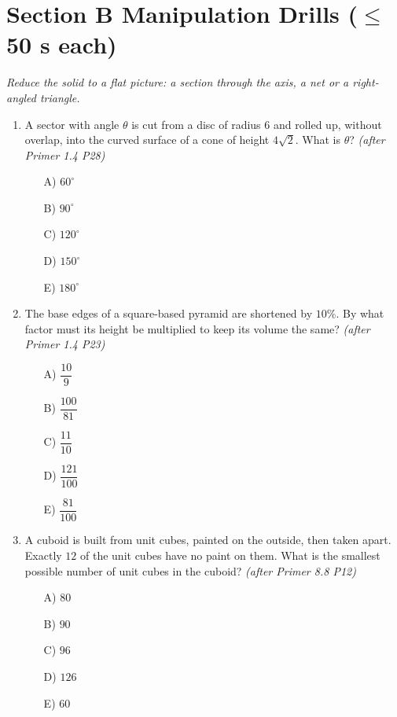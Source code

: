 \documentclass[11pt,a4paper]{article}
\begin{document}
\section*{Section B \quad Manipulation Drills \hfill{\normalfont\small($\leq$50 s each)}}

\noindent\textit{Reduce the solid to a flat picture: a section through the axis, a net or a right-angled triangle.}

\begin{enumerate}

\item A sector with angle $\theta$ is cut from a disc of radius $6$ and rolled up, without overlap, into the curved surface of a cone of height $4\sqrt2$. What is $\theta$? \textit{\small(after Primer 1.4 P28)}
\begin{itemize}
\item[A)] $60^\circ$
\item[B)] $90^\circ$
\item[C)] $120^\circ$
\item[D)] $150^\circ$
\item[E)] $180^\circ$
\end{itemize}

\item The base edges of a square-based pyramid are shortened by $10\%$. By what factor must its height be multiplied to keep its volume the same? \textit{\small(after Primer 1.4 P23)}
\begin{itemize}[itemsep=3pt]
\item[A)] $\dfrac{10}{9}$
\item[B)] $\dfrac{100}{81}$
\item[C)] $\dfrac{11}{10}$
\item[D)] $\dfrac{121}{100}$
\item[E)] $\dfrac{81}{100}$
\end{itemize}

\item A cuboid is built from unit cubes, painted on the outside, then taken apart. Exactly $12$ of the unit cubes have no paint on them. What is the smallest possible number of unit cubes in the cuboid? \textit{\small(after Primer 8.8 P12)}
\begin{itemize}
\item[A)] $80$
\item[B)] $90$
\item[C)] $96$
\item[D)] $126$
\item[E)] $60$
\end{itemize}


\end{enumerate}
\end{document}
